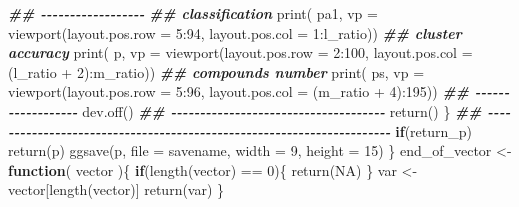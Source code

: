 \documentclass[
]{article}
\newenvironment{Shaded}{\begin{snugshade}}{\end{snugshade}}
\newcommand{\AttributeTok}[1]{\textcolor[rgb]{0.77,0.63,0.00}{#1}}
\newcommand{\ConstantTok}[1]{\textcolor[rgb]{0.00,0.00,0.00}{#1}}
\newcommand{\ControlFlowTok}[1]{\textcolor[rgb]{0.13,0.29,0.53}{\textbf{#1}}}
\newcommand{\DecValTok}[1]{\textcolor[rgb]{0.00,0.00,0.81}{#1}}
\newcommand{\DocumentationTok}[1]{\textcolor[rgb]{0.56,0.35,0.01}{\textbf{\textit{#1}}}}
\newcommand{\FunctionTok}[1]{\textcolor[rgb]{0.00,0.00,0.00}{#1}}
\newcommand{\NormalTok}[1]{#1}
\newcommand{\OtherTok}[1]{\textcolor[rgb]{0.56,0.35,0.01}{#1}}
\newcommand{\SpecialCharTok}[1]{\textcolor[rgb]{0.00,0.00,0.00}{#1}}
\begin{document}
\begin{Shaded}
\begin{Highlighting}[]
      \DocumentationTok{\#\# {-}{-}{-}{-}{-}{-}{-}{-}{-}{-}{-}{-}{-}{-}{-}{-}{-}{-} }
      \DocumentationTok{\#\# classification}
      \FunctionTok{print}\NormalTok{( pa1, }\AttributeTok{vp =} \FunctionTok{viewport}\NormalTok{(}\AttributeTok{layout.pos.row =} \DecValTok{5}\SpecialCharTok{:}\DecValTok{94}\NormalTok{, }\AttributeTok{layout.pos.col =} \DecValTok{1}\SpecialCharTok{:}\NormalTok{l\_ratio))}
      \DocumentationTok{\#\# cluster accuracy}
      \FunctionTok{print}\NormalTok{( p, }\AttributeTok{vp =} \FunctionTok{viewport}\NormalTok{(}\AttributeTok{layout.pos.row =} \DecValTok{2}\SpecialCharTok{:}\DecValTok{100}\NormalTok{, }\AttributeTok{layout.pos.col =}\NormalTok{ (l\_ratio }\SpecialCharTok{+} \DecValTok{2}\NormalTok{)}\SpecialCharTok{:}\NormalTok{m\_ratio))}
      \DocumentationTok{\#\# compounds number}
      \FunctionTok{print}\NormalTok{( ps, }\AttributeTok{vp =} \FunctionTok{viewport}\NormalTok{(}\AttributeTok{layout.pos.row =} \DecValTok{5}\SpecialCharTok{:}\DecValTok{96}\NormalTok{, }\AttributeTok{layout.pos.col =}\NormalTok{ (m\_ratio }\SpecialCharTok{+} \DecValTok{4}\NormalTok{)}\SpecialCharTok{:}\DecValTok{195}\NormalTok{))}
      \DocumentationTok{\#\# {-}{-}{-}{-}{-}{-}{-}{-}{-}{-}{-}{-}{-}{-}{-}{-}{-}{-} }
      \FunctionTok{dev.off}\NormalTok{()}
      \DocumentationTok{\#\# {-}{-}{-}{-}{-}{-}{-}{-}{-}{-}{-}{-}{-}{-}{-}{-}{-}{-}{-}{-}{-}{-}{-}{-}{-}{-}{-}{-}{-}{-}{-}{-}{-}{-}{-}{-}{-} }
      \FunctionTok{return}\NormalTok{()}
\NormalTok{    \}}
    \DocumentationTok{\#\# {-}{-}{-}{-}{-}{-}{-}{-}{-}{-}{-}{-}{-}{-}{-}{-}{-}{-}{-}{-}{-}{-}{-}{-}{-}{-}{-}{-}{-}{-}{-}{-}{-}{-}{-}{-}{-}{-}{-}{-}{-}{-}{-}{-}{-}{-}{-}{-}{-}{-}{-}{-}{-}{-}{-}{-}{-}{-}{-}{-}{-}{-}{-}{-}{-}{-}{-}{-}{-}{-} }
    \ControlFlowTok{if}\NormalTok{(return\_p)}
      \FunctionTok{return}\NormalTok{(p)}
    \FunctionTok{ggsave}\NormalTok{(p, }\AttributeTok{file =}\NormalTok{ savename, }\AttributeTok{width =} \DecValTok{9}\NormalTok{, }\AttributeTok{height =} \DecValTok{15}\NormalTok{)}
\NormalTok{  \}}
\NormalTok{end\_of\_vector }\OtherTok{\textless{}{-}} 
  \ControlFlowTok{function}\NormalTok{(}
\NormalTok{           vector}
\NormalTok{           )\{}
    \ControlFlowTok{if}\NormalTok{(}\FunctionTok{length}\NormalTok{(vector) }\SpecialCharTok{==} \DecValTok{0}\NormalTok{)\{}
      \FunctionTok{return}\NormalTok{(}\ConstantTok{NA}\NormalTok{)}
\NormalTok{    \}}
\NormalTok{    var }\OtherTok{\textless{}{-}}\NormalTok{ vector[}\FunctionTok{length}\NormalTok{(vector)]}
    \FunctionTok{return}\NormalTok{(var)}
\NormalTok{  \}}
\end{Highlighting}
\end{Shaded}
\end{document}
